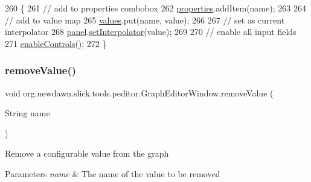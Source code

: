 \begin{DoxyCode}
260                                                                      \{
261         \textcolor{comment}{// add to properties combobox}
262         \mbox{\hyperlink{classorg_1_1newdawn_1_1slick_1_1tools_1_1peditor_1_1_graph_editor_window_ac9d1313ef13023ef8d250b689e52ff12}{properties}}.addItem(name);
263 
264         \textcolor{comment}{// add to value map}
265         \mbox{\hyperlink{classorg_1_1newdawn_1_1slick_1_1tools_1_1peditor_1_1_graph_editor_window_a14eef550e2a6dd21ddb25d4fdec6945c}{values}}.put(name, value);
266 
267         \textcolor{comment}{// set as current interpolator}
268         \mbox{\hyperlink{classorg_1_1newdawn_1_1slick_1_1tools_1_1peditor_1_1_graph_editor_window_ac332b313a344ef1a5becf8e6075dc70b}{panel}}.\mbox{\hyperlink{classorg_1_1newdawn_1_1slick_1_1tools_1_1peditor_1_1_graph_editor_window_1_1_graph_panel_a290757906b8a1372930a6d0f29f886da}{setInterpolator}}(value);
269 
270         \textcolor{comment}{// enable all input fields}
271         \mbox{\hyperlink{classorg_1_1newdawn_1_1slick_1_1tools_1_1peditor_1_1_graph_editor_window_a202a76d9a06ddca4e7c11686f1bfcee6}{enableControls}}();
272     \}
\end{DoxyCode}
\mbox{\label{classorg_1_1newdawn_1_1slick_1_1tools_1_1peditor_1_1_graph_editor_window_a97634b26159ce4a4c2019bad590bc51e}} 
\subsubsection{\texorpdfstring{remove\+Value()}{removeValue()}}
{\footnotesize\ttfamily void org.\+newdawn.\+slick.\+tools.\+peditor.\+Graph\+Editor\+Window.\+remove\+Value (\begin{DoxyParamCaption}\item[{String}]{name }\end{DoxyParamCaption})\hspace{0.3cm}{\ttfamily [inline]}}

Remove a configurable value from the graph


\begin{DoxyParams}{Parameters}
{\em name} & The name of the value to be removed \\
\hline
\end{DoxyParams}

